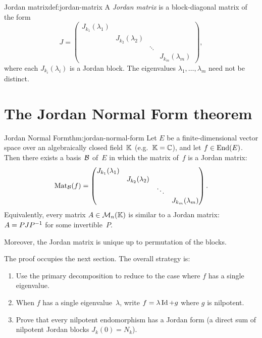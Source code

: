 \begin{definition}{Jordan matrix}{def:jordan-matrix}
A \emph{Jordan matrix} is a block-diagonal matrix of the form
\[
  J = \begin{pmatrix}
    J_{k_1}(\lambda_1) &                     &        \\
                        & J_{k_2}(\lambda_2) &        \\
                        &                     & \ddots \\
                        &                     &        & J_{k_m}(\lambda_m)
  \end{pmatrix},
\]
where each $J_{k_i}(\lambda_i)$ is a Jordan block.  The eigenvalues
$\lambda_1, \ldots, \lambda_m$ need not be distinct.
\end{definition}


\section{The Jordan Normal Form theorem}\label{sec:jordan-theorem}

\begin{theorem}{Jordan Normal Form}{thm:jordan-normal-form}
Let $E$ be a finite-dimensional vector space over an algebraically
closed field~${\mathbb{K}}$ (e.g.\ ${\mathbb{K}} = {\mathbb{C}}$), and let $f \in \operatorname{End}(E)$.  Then
there exists a basis~${\mathcal{B}}$ of~$E$ in which the matrix of~$f$ is a
Jordan matrix:
\[
  \operatorname{Mat}_{\mathcal{B}}(f)
  = \begin{pmatrix}
    J_{k_1}(\lambda_1) &                     &        \\
                        & J_{k_2}(\lambda_2) &        \\
                        &                     & \ddots \\
                        &                     &        & J_{k_m}(\lambda_m)
  \end{pmatrix}.
\]
Equivalently, every matrix $A \in \mathcal{M}_n({\mathbb{K}})$ is similar to a Jordan
matrix: $A = P J {P}^{-1}$ for some invertible~$P$.

Moreover, the Jordan matrix is unique up to permutation of the blocks.
\end{theorem}

The proof occupies the next section.  The overall strategy is:
\begin{enumerate}
  \item Use the primary decomposition to reduce to the case where $f$
    has a single eigenvalue.
  \item When $f$ has a single eigenvalue~$\lambda$, write
    $f = \lambda\operatorname{Id} + g$ where $g$ is nilpotent.
  \item Prove that every nilpotent endomorphism has a Jordan form
    (a direct sum of nilpotent Jordan blocks $J_k(0) = N_k$).
\end{enumerate}


